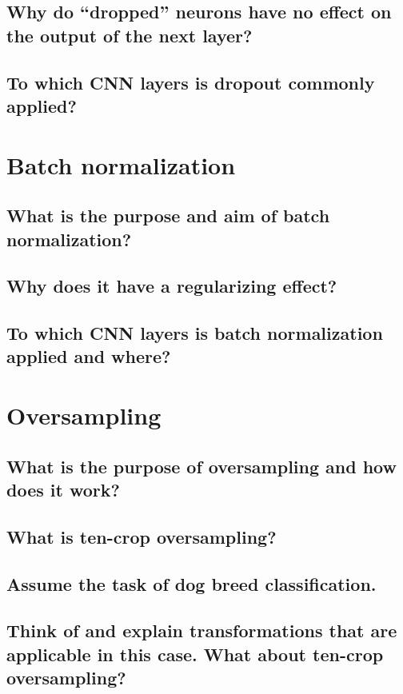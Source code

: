 \subsection{Why do “dropped” neurons have no effect on the output of the next layer?}
\subsection{To which CNN layers is dropout commonly applied?}

\section{Batch normalization}
\subsection{What is the purpose and aim of batch normalization?}
\subsection{Why does it have a regularizing effect?}
\subsection{To which CNN layers is batch normalization applied and where?}


\clearpage

\section{Oversampling}
\subsection{What is the purpose of oversampling and how does it work?}
\subsection{What is ten-crop oversampling?}
\subsection{Assume the task of dog breed classification.}
\subsection{Think of and explain transformations that are applicable in this case. What about ten-crop oversampling?}

